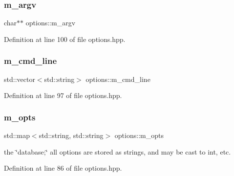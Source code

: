 \mbox{\label{classoptions_a376f7dcfec6a2ff75835c3c3d732bdea}} 
\subsubsection{\texorpdfstring{m\+\_\+argv}{m\_argv}}
{\footnotesize\ttfamily char$\ast$$\ast$ options\+::m\+\_\+argv\hspace{0.3cm}{\ttfamily [private]}}



Definition at line 100 of file options.\+hpp.

\mbox{\label{classoptions_a64ad628e508d5d71a117909e44f68350}} 
\subsubsection{\texorpdfstring{m\+\_\+cmd\+\_\+line}{m\_cmd\_line}}
{\footnotesize\ttfamily std\+::vector$<$std\+::string$>$ options\+::m\+\_\+cmd\+\_\+line\hspace{0.3cm}{\ttfamily [private]}}



Definition at line 97 of file options.\+hpp.

\mbox{\label{classoptions_ac73507ca925d98ee5ff6f04937dff5c3}} 
\subsubsection{\texorpdfstring{m\+\_\+opts}{m\_opts}}
{\footnotesize\ttfamily std\+::map$<$std\+::string, std\+::string$>$ options\+::m\+\_\+opts\hspace{0.3cm}{\ttfamily [private]}}



the \char`\"{}database;\char`\"{} all options are stored as strings, and may be cast to int, etc. 



Definition at line 86 of file options.\+hpp.

\mbox{\label{classoptions_a3171bb61cdfcc5a6a899ad6fe9b56f9d}} 
